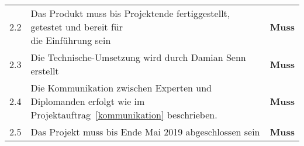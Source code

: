 \begin{longtable}[]{@{}llc@{}}
  2.2  & \makecell[l]{Das Produkt muss bis Projektende fertiggestellt, getestet und                                            bereit für                                \\ die Einführung sein}     & \textbf{Muss}\tabularnewline
  2.3  & Die Technische-Umsetzung wird durch Damian Senn erstellt                                                                         & \textbf{Muss}\tabularnewline
  2.4  & \makecell[l]{Die Kommunikation zwischen Experten und Diplomanden erfolgt wie im                                                                                 \\ Projektauftrag~\ref{kommunikation} beschrieben.} & \textbf{Muss}\tabularnewline
  2.5  & Das Projekt muss bis Ende Mai 2019 abgeschlossen sein                                                                            & \textbf{Muss}\tabularnewline
  \bottomrule
\end{longtable}
